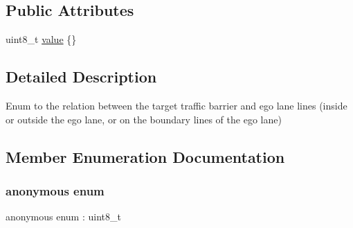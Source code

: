 \subsection*{Public Attributes}
\begin{DoxyCompactItemize}
\item 
uint8\+\_\+t \hyperlink{structmaf__perception__interface_1_1TrafficBarrierEgoLaneRelationEnum_a0d179eddd84c13083d46c69ffed6000d}{value} \{\}
\end{DoxyCompactItemize}


\subsection{Detailed Description}
Enum to the relation between the target traffic barrier and ego lane lines (inside or outside the ego lane, or on the boundary lines of the ego lane) 

\subsection{Member Enumeration Documentation}
\mbox{\label{structmaf__perception__interface_1_1TrafficBarrierEgoLaneRelationEnum_ae602cdaece545355f4f217defcf9b05e}} 
\subsubsection{\texorpdfstring{anonymous enum}{anonymous enum}}
{\footnotesize\ttfamily anonymous enum \+: uint8\+\_\+t}

